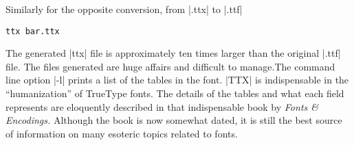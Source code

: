 Similarly for the opposite conversion, from |.ttx| to |.ttf|

\begin{verbatim}
ttx bar.ttx
\end{verbatim}

The generated |ttx| file is approximately ten times larger than the original |.ttf| file. The files generated are huge affairs and difficult to manage.The command line option |-l| prints a list of the tables in the font. |TTX| is indispensable in the ``humanization'' of TrueType fonts. The details of the tables and what each field represents are eloquently described in that indispensable book by  \textit{Fonts \& Encodings.} Although the book is now somewhat dated, it is still the best source of information on many esoteric topics related to fonts. 





